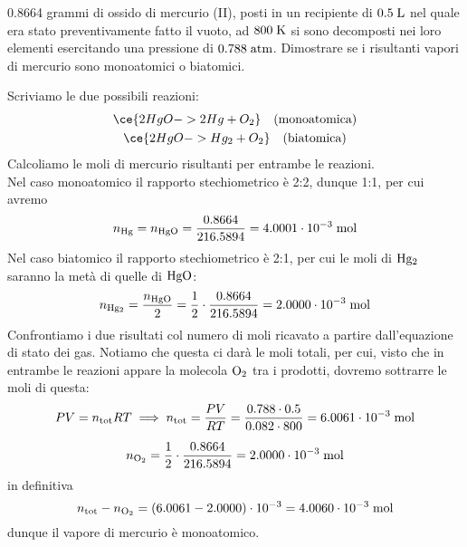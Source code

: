 \begin{esercizio}
    0.8664 grammi di ossido di mercurio (II), posti in un recipiente di $0.5 \; \rm L$ nel quale era stato preventivamente fatto il vuoto, ad $800 \; \rm K$ si sono decomposti nei loro elementi esercitando una pressione di $0.788 \; \rm atm$. Dimostrare se i risultanti vapori di mercurio sono monoatomici o biatomici.
\end{esercizio}
\begin{soluzione}
    Scriviamo le due possibili reazioni:
    \begin{gather*}
        \ce{2HgO -> 2Hg + O_2}
        \quad(\text{monoatomica})
        \\
        \ce{2HgO -> Hg_2 + O_2}
        \quad(\text{biatomica})
    \end{gather*}
    Calcoliamo le moli di mercurio risultanti per entrambe le reazioni.\\
    Nel caso monoatomico il rapporto stechiometrico è 2:2, dunque 1:1, per cui avremo
    \begin{equation*}
        n_{\rm Hg}=n_{\rm HgO}
        =\frac{0.8664}{216.5894}
        =4.0001 \cdot 10^{-3} \; \rm mol
    \end{equation*}
    Nel caso biatomico il rapporto stechiometrico è 2:1, per cui le moli di $\rm Hg_2$ saranno la metà di quelle di $\rm HgO$:
    \begin{equation*}
        n_{\rm Hg_2}=\frac{n_{\rm HgO}}{2}
        =\frac{1}{2} \cdot \frac{0.8664}{216.5894}
        =2.0000 \cdot 10^{-3} \; \rm mol
    \end{equation*}
    Confrontiamo i due risultati col numero di moli ricavato a partire dall'equazione di stato dei gas. Notiamo che questa ci darà le moli totali, per cui, visto che in entrambe le reazioni appare la molecola $\rm O_2$ tra i prodotti, dovremo sottrarre le moli di questa:
    \begin{gather*}
        PV=n_{\rm tot}RT
        \implies
        n_{\rm tot}
        =\frac{PV}{RT}
        =\frac{0.788 \cdot 0.5}{0.082 \cdot 800}
        =6.0061 \cdot 10^{-3} \; \rm mol
        \\[0.2cm]
        n_{\rm O_2}
        =\frac{1}{2} \cdot \frac{0.8664}{216.5894}
        =2.0000 \cdot 10^{-3} \; \rm mol
    \end{gather*}
    in definitiva
    \begin{equation*}
        n_{\rm tot} - n_{\rm O_2}
        =(6.0061 - 2.0000) \cdot 10^{-3}
        =4.0060 \cdot 10^{-3} \; \rm mol
    \end{equation*}
    dunque il vapore di mercurio è monoatomico.
\end{soluzione}

